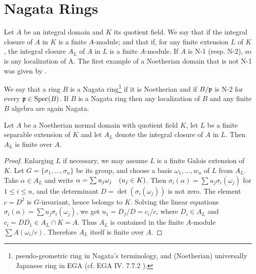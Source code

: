 \documentclass[../main]{subfiles}
\begin{document}
\section{Nagata Rings}\label{sec:31}

\begin{pardefinition}
 Let $A$ be an integral domain and $K$ its quotient field. We say that  if the integral closure of $A$ in $K$ is a finite $A$-module; and that  if, for any finite extension $L$ of $K$, the integral closure $A_L$ of $A$ in $L$ is a finite $A$-module. If $A$ is N-1 (resp. N-2), so is any localization of A. The first example of a Noetherian domain that is not N-1 was given by \cite{akizuji1935proceedings}.
\end{pardefinition}
We say that a ring $B$ is a Nagata ring\footnote{pseudo-geometric ring in Nagata's terminology, and (Noetherian) universally Japanese ring in EGA (cf. EGA IV. 7.7.2 \cite{egaIV}).} if it is Noetherian and if $B / \mathfrak{p}$ is N-2 for every $\mathfrak{p} \in \operatorname{Spec}(B)$. If $B$ is a Nagata ring then any localization of $B$ and any finite $B$ algebra are again Nagata.

\begin{parproposition}\label{pro:31.01} Let $A$ be a Noetherian normal domain with quotient field $K$, let $L$ be a finite separable extension of $K$ and let $A_L$ denote the integral closure of $A$ in $L$. Then $A_L$ is finite over $A$.
\end{parproposition}
\begin{proof} Enlarging $L$ if necessary, we may assume $L$ is a finite Galois extension of $K$. Let $G=\{\sigma_1, \ldots, \sigma_n\}$ be its group, and choose a basis $\omega_1, \ldots, w_n$ of $L$ from $A_L$. Take $\alpha \in A_L$ and write $\alpha=\sum u_j \omega_j\for{u_j \in K}$. Then $\sigma_i(\alpha)=\sum u_j \sigma_i(\omega_j)$ for $1 \leq i \leq n$, and the determinant $D=\det(\sigma_i(\omega_j))$ is not zero. The element $c=D^2$ is $G$-invariant, hence belongs to $K$. Solving the linear equations\newline $\sigma_i(\alpha)=\sum u_j \sigma_i(\omega_j)$, we get $u_1=D_f / D =c_i / c$, where $D_i \in A_L$ and $c_i=DD_1 \in A_L \cap K=A$. Thus $A_L$ is contained in the finite $A$-module $\sum A(\omega_i / c)$. Therefore $A_L$ itself is finite over $A$.\end{proof}
\end{document}
